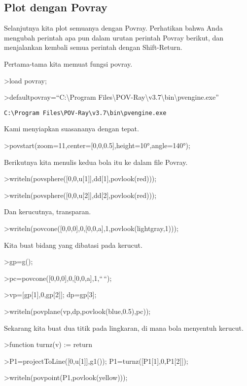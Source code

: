 \documentclass[
]{book}
\begin{document}
\subsection{Plot dengan Povray}\label{plot-dengan-povray}

Selanjutnya kita plot semuanya dengan Povray. Perhatikan bahwa Anda mengubah perintah apa pun dalam urutan perintah Povray berikut, dan menjalankan kembali semua perintah dengan Shift-Return.

Pertama-tama kita memuat fungsi povray.

\textgreater load povray;

\textgreater defaultpovray=``C:\textbackslash Program Files\textbackslash POV-Ray\textbackslash v3.7\textbackslash bin\textbackslash pvengine.exe''

\begin{verbatim}
C:\Program Files\POV-Ray\v3.7\bin\pvengine.exe
\end{verbatim}

Kami menyiapkan suasananya dengan tepat.

\textgreater povstart(zoom=11,center={[}0,0,0.5{]},height=10°,angle=140°);

Berikutnya kita menulis kedua bola itu ke dalam file Povray.

\textgreater writeln(povsphere({[}0,0,u{[}1{]}{]},dd{[}1{]},povlook(red)));

\textgreater writeln(povsphere({[}0,0,u{[}2{]}{]},dd{[}2{]},povlook(red)));

Dan kerucutnya, transparan.

\textgreater writeln(povcone({[}0,0,0{]},0,{[}0,0,a{]},1,povlook(lightgray,1)));

Kita buat bidang yang dibatasi pada kerucut.

\textgreater gp=g();

\textgreater pc=povcone({[}0,0,0{]},0,{[}0,0,a{]},1,``\,``);

\textgreater vp={[}gp{[}1{]},0,gp{[}2{]}{]}; dp=gp{[}3{]};

\textgreater writeln(povplane(vp,dp,povlook(blue,0.5),pc));

Sekarang kita buat dua titik pada lingkaran, di mana bola menyentuh kerucut.

\textgreater function turnz(v) := return

\textgreater P1=projectToLine({[}0,u{[}1{]}{]},g1()); P1=turnz({[}P1{[}1{]},0,P1{[}2{]}{]});

\textgreater writeln(povpoint(P1,povlook(yellow)));
\end{document}
